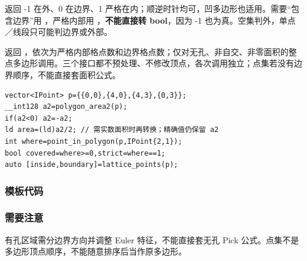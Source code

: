  返回 -1 在外、0 在边界、1 严格在内；顺逆时针均可，凹多边形也适用。需要“包含边界”用 ，严格内部用 ，\textbf{不能直接转 bool}，因为 -1 也为真。空集判外，单点／线段只可能判边界或外部。

 返回 ，依次为严格内部格点数和边界格点数；仅对无孔、非自交、非零面积的整点多边形调用。三个接口都不预处理、不修改顶点，各次调用独立；点集若没有边界顺序，不能直接套面积公式。
\begin{lstlisting}[style=mtycpp,numbers=none]
vector<IPoint> p={{0,0},{4,0},{4,3},{0,3}};
__int128 a2=polygon_area2(p);
if(a2<0) a2=-a2;
ld area=(ld)a2/2; // 需实数面积时再转换；精确值仍保留 a2
int where=point_in_polygon(p,IPoint{2,1});
bool covered=where>=0,strict=where==1;
auto [inside,boundary]=lattice_points(p);
\end{lstlisting}
\subsubsection*{模板代码}
\subsubsection*{需要注意}
有孔区域需分边界方向并调整 Euler 特征，不能直接套无孔 Pick 公式。点集不是多边形顶点顺序，不能随意排序后当作原多边形。
